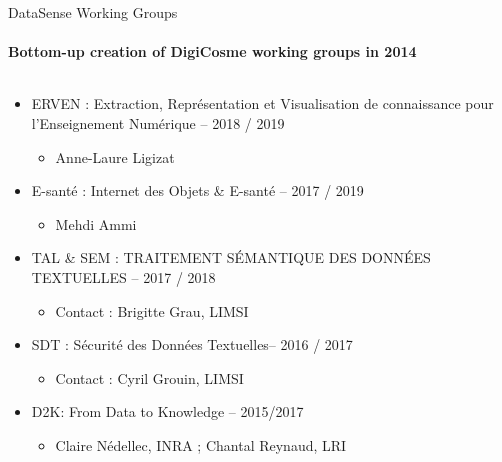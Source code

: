 \begin{frame}{DataSense Working Groups}
  \framesubtitle{Bottom-up creation of DigiCosme working groups in 2014}
  \vspace*{-8mm}

  \begin{columns}\footnotesize
    \begin{column}[t]{5.5cm}
      \begin{itemize}

       \item ERVEN : Extraction, Représentation et Visualisation de connaissance pour
l'Enseignement Numérique -- 2018 / 2019
        \begin{itemize}
        \item Anne-Laure Ligizat
        \end{itemize}

        \item E-santé : Internet des Objets & E-santé -- 2017 / 2019
        \begin{itemize}
        \item Mehdi Ammi
        \end{itemize}

        \item TAL \& SEM : TRAITEMENT SÉMANTIQUE DES DONNÉES TEXTUELLES -- 2017 / 2018
        \begin{itemize}
        \item  Contact : Brigitte Grau, LIMSI
        \end{itemize}

        \item SDT : Sécurité des Données Textuelles-- 2016 / 2017
        \begin{itemize}
        \item Contact : Cyril Grouin, LIMSI
        \end{itemize}

      \item D2K: From Data to Knowledge -- 2015/2017
        \begin{itemize}
        \item Claire Nédellec, INRA ; Chantal Reynaud, LRI 
        \end{itemize}


\end{itemize}
\end{column}
\end{columns}
\end{frame}
